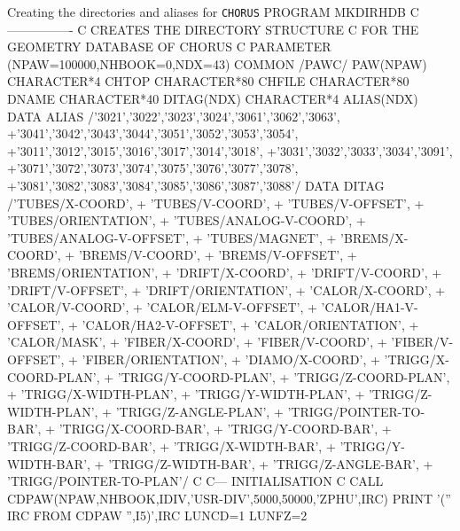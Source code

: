 \begin{XMPt}{Creating the directories and aliases for {\tt CHORUS}}
      PROGRAM MKDIRHDB
C     ----------------
C     CREATES THE DIRECTORY STRUCTURE
C     FOR THE GEOMETRY DATABASE OF CHORUS
C
      PARAMETER (NPAW=100000,NHBOOK=0,NDX=43)
      COMMON /PAWC/ PAW(NPAW)
      CHARACTER*4 CHTOP
      CHARACTER*80 CHFILE
      CHARACTER*80 DNAME
      CHARACTER*40 DITAG(NDX)
      CHARACTER*4  ALIAS(NDX)
      DATA ALIAS /'3021','3022','3023','3024','3061','3062','3063',
     +'3041','3042','3043','3044','3051','3052','3053','3054',
     +'3011','3012','3015','3016','3017','3014','3018',
     +'3031','3032','3033','3034','3091',
     +'3071','3072','3073','3074','3075','3076','3077','3078',
     +'3081','3082','3083','3084','3085','3086','3087','3088'/
      DATA DITAG /'TUBES/X-COORD',
     +            'TUBES/V-COORD',
     +            'TUBES/V-OFFSET',
     +            'TUBES/ORIENTATION',
     +            'TUBES/ANALOG-V-COORD',
     +            'TUBES/ANALOG-V-OFFSET',
     +            'TUBES/MAGNET',
     +            'BREMS/X-COORD',
     +            'BREMS/V-COORD',
     +            'BREMS/V-OFFSET',
     +            'BREMS/ORIENTATION',
     +            'DRIFT/X-COORD',
     +            'DRIFT/V-COORD',
     +            'DRIFT/V-OFFSET',
     +            'DRIFT/ORIENTATION',
     +            'CALOR/X-COORD',
     +            'CALOR/V-COORD',
     +            'CALOR/ELM-V-OFFSET',
     +            'CALOR/HA1-V-OFFSET',
     +            'CALOR/HA2-V-OFFSET',
     +            'CALOR/ORIENTATION',
     +            'CALOR/MASK',
     +            'FIBER/X-COORD',
     +            'FIBER/V-COORD',
     +            'FIBER/V-OFFSET',
     +            'FIBER/ORIENTATION',
     +            'DIAMO/X-COORD',
     +            'TRIGG/X-COORD-PLAN',
     +            'TRIGG/Y-COORD-PLAN',
     +            'TRIGG/Z-COORD-PLAN',
     +            'TRIGG/X-WIDTH-PLAN',
     +            'TRIGG/Y-WIDTH-PLAN',
     +            'TRIGG/Z-WIDTH-PLAN',
     +            'TRIGG/Z-ANGLE-PLAN',
     +            'TRIGG/POINTER-TO-BAR',
     +            'TRIGG/X-COORD-BAR',
     +            'TRIGG/Y-COORD-BAR',
     +            'TRIGG/Z-COORD-BAR',
     +            'TRIGG/X-WIDTH-BAR',
     +            'TRIGG/Y-WIDTH-BAR',
     +            'TRIGG/Z-WIDTH-BAR',
     +            'TRIGG/Z-ANGLE-BAR',
     +            'TRIGG/POINTER-TO-PLAN'/
C
C---      INITIALISATION
C
      CALL CDPAW(NPAW,NHBOOK,IDIV,'USR-DIV',5000,50000,'ZPHU',IRC)
      PRINT '('' IRC FROM CDPAW '',I5)',IRC
      LUNCD=1
      LUNFZ=2

\end{XMPt}
